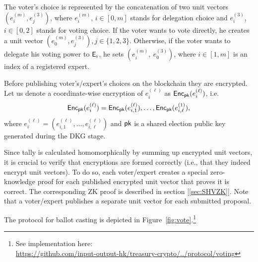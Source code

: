 The voter's choice is represented by the concatenation of two  unit vectors $( e^{(m)}_i , e^{(3)}_j )$, where $e^{(m)}_i$, $i\in[0,m]$ stands for delegation choice and $e^{(3)}_i$, $i\in[0,2]$ stands for voting choice. If the voter wants to vote directly, he creates a unit vector $( e^{(m)}_0 , e^{(3)}_j ), j \in \{1,2,3\}$. Otherwise, if the voter wants to delegate his voting power to $\mathsf{E}_i$, he sets $(e^{(m)}_i,\ e^{(3)}_0 )$, where $i \in [1,m]$ is an index of a registered expert. 

Before publishing voter's/expert's choices on the blockchain they are encrypted. Let us denote a coordinate-wise encryption of $e^{(\ell)}_i$ as $\mathsf{Enc}_{\mathsf{pk}}(e^{(\ell)}_i )$, i.e. 
\[\mathsf{Enc}_{\mathsf{pk}}(e^{(\ell)}_i ) = \mathsf{Enc}_{\mathsf{pk}}(e^{(\ell)}_{i,1}), \ldots, \mathsf{Enc}_{\mathsf{pk}}(e^{(1)}_{i,\ell}),\]
where $e^{(\ell)}_i = (e^{(\ell)}_{i,1},\ldots, e^{(\ell)}_{i,\ell})$ and $\mathsf{pk}$ is a shared election public key generated during the DKG stage.

Since tally is calculated homomorphically by summing up encrypted unit vectors, it is crucial to verify that encryptions are formed correctly (i.e., that they indeed encrypt unit vectors). To do so, each voter/expert creates a special zero-knowledge proof for each published encrypted unit vector that proves it is correct. The corresponding ZK proof is described in section [\ref{sec:SHVZK}].
Note that a voter/expert publishes a separate unit vector for each submitted proposal.

The protocol for ballot casting is depicted in Figure~\ref{fig:vote}.\footnote{See implementation here:\\ \href{https://github.com/input-output-hk/treasury-crypto/tree/new_api/src/main/scala/io/iohk/protocol/voting}{https://github.com/input-output-hk/treasury-crypto/../protocol/voting}}

